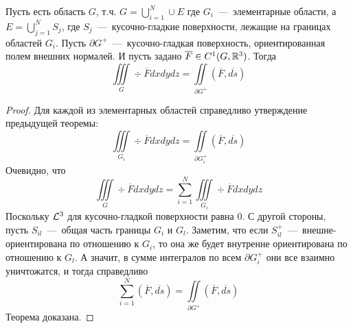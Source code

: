 \begin{theorem}
    Пусть есть область $G$, т.ч. $G = \bigcup\limits_{i = 1}^N \cup E$ где $G_i$~---~элементарные области, а $E = \bigcup\limits_{j = 1}^N S_j$, где $S_j$~---~кусочно-гладкие поверхности, лежащие на границах областей $G_i$. Пусть $\partial G^+$~---~кусочно-гладкая поверхность, ориентированная полем внешних нормалей. И пусть задано $\overline{F} \in C^1(G, \mathbb{R}^3)$. Тогда \[\iiint\limits_{G} \div \overline{F} dxdydz = \iint\limits_{\partial G^+} (\overline{F}, \overline{ds})\]
\end{theorem}
\begin{proof}
    Для каждой из элементарных областей справедливо утверждение предыдущей теоремы: \[\iiint\limits_{G_i} \div \overline{F} dxdydz = \iint\limits_{\partial G_i^+} (\overline{F}, \overline{ds})\]
    Очевидно, что \[\iiint\limits_{G} \div \overline{F} dxdydz = \sum\limits_{i = 1}^N \iiint\limits_{G_i}\div \overline{F} dxdydz\]
    Поскольку $\mathcal{L}^3$ для кусочно-гладкой поверхности равна $0$. С другой стороны, пусть $S_{il}$~---~общая часть границы $G_i$ и $G_l$. Заметим, что если $S^+_{il}$~---~внешне-ориентирована по отношению к $G_i$, то она же будет внутренне ориентирована по отношению к $G_l$. А значит, в сумме интегралов по всем $\partial G^+_i$ они все взаимно уничтожатся, и тогда справедливо \[\sum\limits_{i = 1}^N (\overline{F}, \overline{ds}) = \iint\limits_{\partial G^+} (\overline{F}, \overline{ds})\]
    Теорема доказана.
\end{proof}